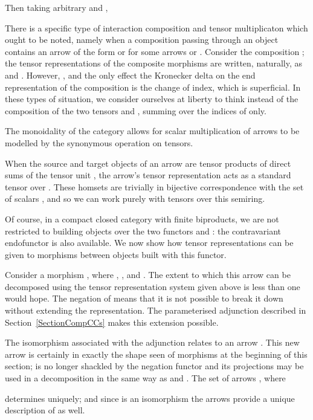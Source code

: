 \documentclass{LMCS}
\theoremstyle{plain}\newtheorem*{cLm}{Claim}
\newcommand{\p}{} \newcommand{\N}{\mathbb{N}}
\begin{document}
\noindent Then taking arbitrary  and ,
\smallskip

There is a specific type of interaction composition and tensor multiplicaton which ought to be noted, namely when a composition passing through an object  contains an arrow of the form  or  for some arrows  or . Consider the composition ; the tensor representations of the composite morphisms are written, naturally, as  and . However, , and the only effect the Kronecker delta on the end representation of the composition is the change of index, which is superficial. In these types of situation, we consider ourselves at liberty to think instead of the composition of the two tensors  and , summing over the indices of  only.

\p The monoidality of the category  allows for scalar multiplication of arrows to be modelled by the synonymous operation on tensors.
\smallskip

When the source and target objects of an arrow are tensor products of direct sums of the tensor unit , the arrow's tensor representation acts as a standard tensor over \linebreak . These homsets are trivially in bijective correspondence with the set of scalars , and so we can work purely with tensors over this semiring.

\p Of course, in a compact closed category with finite biproducts, we are not restricted to building objects over the two functors  and : the contravariant endofunctor  is also available. We now show how tensor representations can be given to morphisms between objects built with this functor.

\p Consider a morphism , where , , and \linebreak . The extent to which this arrow can be decomposed using the tensor representation system given above is less than one would hope. The negation of  means that it is not possible to break it down without extending the representation. The parameterised adjunction  described in Section~\ref{SectionCompCCs} makes this extension possible.

\p The isomorphism  associated with the adjunction relates  to an arrow \linebreak . This new arrow is certainly in exactly the shape seen of morphisms at the beginning of this section;  is no longer shackled by the negation functor and its projections may be used in a decomposition in the same way as  and . The set of arrows , where

determines  uniquely; and since  is an isomorphism the arrows provide a unique description of  as well.
\end{document}

